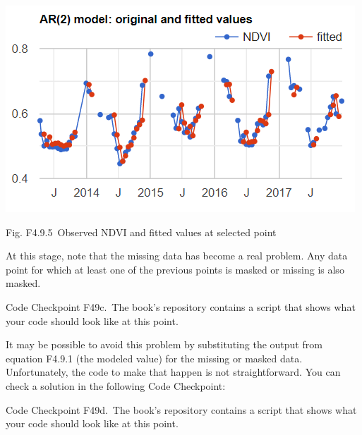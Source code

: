 \documentclass[
  letterpaper,
  DIV=11,
  numbers=noendperiod]{scrreprt}
\begin{document}
\includegraphics{./F4/image19.png}

Fig. F4.9.5~Observed NDVI and fitted values at selected point

At this stage, note that the missing data has become a real problem. Any
data point for which at least one of the previous points is masked or
missing is also masked.

\begin{tcolorbox}[enhanced jigsaw, left=2mm, breakable, rightrule=.15mm, opacityback=0, colframe=quarto-callout-note-color-frame, colbacktitle=quarto-callout-note-color!10!white, arc=.35mm, opacitybacktitle=0.6, toptitle=1mm, colback=white, leftrule=.75mm, title=\textcolor{quarto-callout-note-color}{\faInfo}\hspace{0.5em}{Note}, toprule=.15mm, bottomtitle=1mm, titlerule=0mm, bottomrule=.15mm, coltitle=black]

Code Checkpoint F49c.~The book's repository contains a script that shows
what your code should look like at this point.

\end{tcolorbox}

It may be possible to avoid this problem by substituting the output from
equation F4.9.1 (the modeled value) for the missing or masked data.
Unfortunately, the code to make that happen is not straightforward. You
can check a solution in the following Code Checkpoint:

\begin{tcolorbox}[enhanced jigsaw, left=2mm, breakable, rightrule=.15mm, opacityback=0, colframe=quarto-callout-note-color-frame, colbacktitle=quarto-callout-note-color!10!white, arc=.35mm, opacitybacktitle=0.6, toptitle=1mm, colback=white, leftrule=.75mm, title=\textcolor{quarto-callout-note-color}{\faInfo}\hspace{0.5em}{Note}, toprule=.15mm, bottomtitle=1mm, titlerule=0mm, bottomrule=.15mm, coltitle=black]

Code Checkpoint F49d.~The book's repository contains a script that shows
what your code should look like at this point.

\end{tcolorbox}
\end{document}
